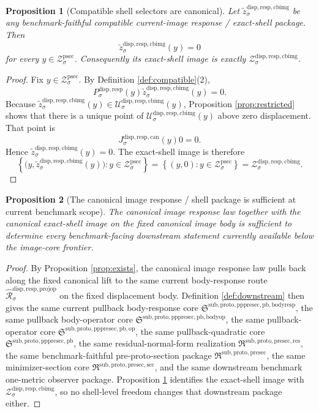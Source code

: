 \documentclass[11pt]{article}
\newcommand{\ProtoSectionShell}[1]{\mathcal Z_{#1}^{\mathrm{psec}}}
\newcommand{\PrePreProtoSectionPullbackCore}{\mathfrak S^{\mathrm{sub,proto,pppresec,pb}}}
\newcommand{\PullbackOperatorCore}{\mathfrak S^{\mathrm{sub,proto,pppresec,pb,op}}}
\newcommand{\PullbackBodyOperatorCore}{\mathfrak S^{\mathrm{sub,proto,pppresec,pb,bodyop}}}
\newcommand{\PullbackBodyResponseCore}{\mathfrak S^{\mathrm{sub,proto,pppresec,pb,bodyresp}}}
\newcommand{\PreProtoSectionResidualPackage}{\mathfrak R^{\mathrm{sub,proto,presec,res}}}
\newcommand{\PreProtoSectionPackage}{\mathfrak R^{\mathrm{sub,proto,presec}}}
\newcommand{\PreProtoSectionMinSectionCore}{\mathfrak R^{\mathrm{sub,proto,presec,sec}}}
\newcommand{\SubstrateProjection}[1]{P_{#1}^{\mathrm{disp,resp}}}
\newcommand{\CanonicalLift}[1]{J_{#1}^{\mathrm{disp,resp,can}}}
\newcommand{\CoreForcedBodyResponse}[1]{\widehat{\mathscr R}_{#1}^{\mathrm{disp,resp,projop}}}
\newcommand{\CanonicalImageBody}[1]{\mathcal U_{#1}^{\mathrm{disp,resp,cbimg}}}
\newcommand{\CanonicalImageShell}[1]{\mathcal Z_{#1}^{\mathrm{disp,resp,cbimg}}}
\newcommand{\CompatibleShellSection}[1]{\widetilde z_{#1}^{\mathrm{disp,resp,cbimg}}}
\newtheorem{proposition}{Proposition}
\begin{document}
\begin{proposition}[Compatible shell selectors are canonical]
\label{prop:shell}
Let \(\CompatibleShellSection{\sigma}\) be any benchmark-faithful compatible current-image response / exact-shell package. Then
\[
\CompatibleShellSection{\sigma}(y)=0
\]
for every \(y\in\ProtoSectionShell{\sigma}\). Consequently its exact-shell image is exactly \(\CanonicalImageShell{\sigma}\).
\end{proposition}

\begin{proof}
Fix \(y\in\ProtoSectionShell{\sigma}\). By Definition \ref{def:compatible}(2),
\[
\SubstrateProjection{\sigma}(y)\CompatibleShellSection{\sigma}(y)=0.
\]
Because \(\CompatibleShellSection{\sigma}(y)\in\CanonicalImageBody{\sigma}(y)\), Proposition \ref{prop:restricted} shows that there is a unique point of \(\CanonicalImageBody{\sigma}(y)\) above zero displacement. That point is
\[
\CanonicalLift{\sigma}(y)0=0.
\]
Hence \(\CompatibleShellSection{\sigma}(y)=0\). The exact-shell image is therefore
\[
\left\{
\bigl(y,\CompatibleShellSection{\sigma}(y)\bigr):
y\in\ProtoSectionShell{\sigma}
\right\}
=
\left\{
(y,0):y\in\ProtoSectionShell{\sigma}
\right\}
=
\CanonicalImageShell{\sigma}.
\]
\end{proof}

\begin{proposition}[The canonical image response / shell package is sufficient at current benchmark scope]
\label{prop:sufficient}
The canonical image response law together with the canonical exact-shell image on the fixed canonical image body is sufficient to determine every benchmark-facing downstream statement currently available below the image-core frontier.
\end{proposition}

\begin{proof}
By Proposition \ref{prop:exists}, the canonical image response law pulls back along the fixed canonical lift to the same current body-response route \(\CoreForcedBodyResponse{\sigma}\) on the fixed displacement body. Definition \ref{def:downstream} then gives the same current pullback body-response core \(\PullbackBodyResponseCore\), the same pullback body-operator core \(\PullbackBodyOperatorCore\), the same pullback-operator core \(\PullbackOperatorCore\), the same pullback-quadratic core \(\PrePreProtoSectionPullbackCore\), the same residual-normal-form realization \(\PreProtoSectionResidualPackage\), the same benchmark-faithful pre-proto-section package \(\PreProtoSectionPackage\), the same minimizer-section core \(\PreProtoSectionMinSectionCore\), and the same downstream benchmark one-metric observer package. Proposition \ref{prop:shell} identifies the exact-shell image with \(\CanonicalImageShell{\sigma}\), so no shell-level freedom changes that downstream package either.
\end{proof}
\end{document}
